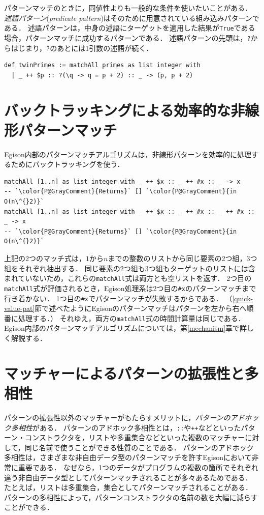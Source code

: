 パターンマッチのときに，同値性よりも一般的な条件を使いたいことがある．
\emph{述語パターン}(\emph{predicate pattern})はそのために用意されている組み込みパターンである．
述語パターンは，中身の述語にターゲットを適用した結果が\lstinline{True}である場合，パターンマッチに成功するパターンである．
述語パターンの先頭は，\lstinline{?}からはじまり，\lstinline{?}のあとには1引数の述語が続く．
\begin{lstlisting}[language=egison,numbers=none]
def twinPrimes := matchAll primes as list integer with
  | _ ++ $p :: ?(\q -> q = p + 2) :: _ -> (p, p + 2)
\end{lstlisting}

\section{バックトラッキングによる効率的な非線形パターンマッチ}\label{quick-backtrack}

Egison内部のパターンマッチアルゴリズムは，非線形パターンを効率的に処理するためにバックトラッキングを使う．
\begin{lstlisting}[language=egison,numbers=none]
matchAll [1..n] as list integer with _ ++ $x :: _ ++ #x :: _ -> x
-- `\color{P@GrayComment}{Returns}` [] `\color{P@GrayComment}{in O(n\^{}2)}`
matchAll [1..n] as list integer with _ ++ $x :: _ ++ #x :: _ ++ #x :: _ -> x
-- `\color{P@GrayComment}{Returns}` [] `\color{P@GrayComment}{in O(n\^{}2)}`
\end{lstlisting}
上記の2つのマッチ式は，$1$から$n$までの整数のリストから同じ要素の2つ組，3つ組をそれぞれ抽出する．
同じ要素の2つ組も3つ組もターゲットのリストには含まれていないため，これらの\lstinline{matchAll}式は両方とも空リストを返す．
2つ目の\lstinline{matchAll}式が評価されるとき，Egison処理系は2つ目の\lstinline|#x|のパターンマッチまで行き着かない．
1つ目の\lstinline|#x|でパターンマッチが失敗するからである．
（\ref{quick-value-pat}節で述べたようにEgisonのパターンマッチはパターンを左から右へ順番に処理する．）
それゆえ，両方の\lstinline{matchAll}式の時間計算量は同じである．
Egison内部のパターンマッチアルゴリズムについては，第\ref{mechanism}章で詳しく解説する．

\section{マッチャーによるパターンの拡張性と多相性}\label{quick-matcher}

パターンの拡張性以外のマッチャーがもたらすメリットに，\emph{パターンのアドホック多相性}がある．
パターンのアドホック多相性とは，\lstinline{::}や\lstinline{++}などといったパターン・コンストラクタを，リストや多重集合などといった複数のマッチャーに対して，同じ名前で使うことができる性質のことである．
パターンのアドホック多相性は，さまざまな非自由データ型のパターンマッチを許すEgisonにおいて非常に重要である．
なぜなら，1つのデータがプログラムの複数の箇所でそれぞれ違う非自由データ型としてパターンマッチされることが多々あるためである．
たとえば，リストは多重集合，集合としてパターンマッチされることがある．
パターンの多相性によって，パターンコンストラクタの名前の数を大幅に減らすことができる．

